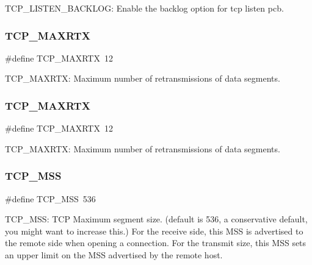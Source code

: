 T\+C\+P\+\_\+\+L\+I\+S\+T\+E\+N\+\_\+\+B\+A\+C\+K\+L\+OG\+: Enable the backlog option for tcp listen pcb. \mbox{\label{group__lwip__opts__tcp_ga0dee0911197855bdf19ef79778c241a6}} 
\subsubsection{\texorpdfstring{T\+C\+P\+\_\+\+M\+A\+X\+R\+TX}{TCP\_MAXRTX}\hspace{0.1cm}{\footnotesize\ttfamily [1/2]}}
{\footnotesize\ttfamily \#define T\+C\+P\+\_\+\+M\+A\+X\+R\+TX~12}

T\+C\+P\+\_\+\+M\+A\+X\+R\+TX\+: Maximum number of retransmissions of data segments. \mbox{\label{group__lwip__opts__tcp_ga0dee0911197855bdf19ef79778c241a6}} 
\subsubsection{\texorpdfstring{T\+C\+P\+\_\+\+M\+A\+X\+R\+TX}{TCP\_MAXRTX}\hspace{0.1cm}{\footnotesize\ttfamily [2/2]}}
{\footnotesize\ttfamily \#define T\+C\+P\+\_\+\+M\+A\+X\+R\+TX~12}

T\+C\+P\+\_\+\+M\+A\+X\+R\+TX\+: Maximum number of retransmissions of data segments. \mbox{\label{group__lwip__opts__tcp_gaf1ab7bb27860aa3677c387a2f3ba317b}} 
\subsubsection{\texorpdfstring{T\+C\+P\+\_\+\+M\+SS}{TCP\_MSS}\hspace{0.1cm}{\footnotesize\ttfamily [1/2]}}
{\footnotesize\ttfamily \#define T\+C\+P\+\_\+\+M\+SS~536}

T\+C\+P\+\_\+\+M\+SS\+: T\+CP Maximum segment size. (default is 536, a conservative default, you might want to increase this.) For the receive side, this M\+SS is advertised to the remote side when opening a connection. For the transmit size, this M\+SS sets an upper limit on the M\+SS advertised by the remote host. \mbox{\label{group__lwip__opts__tcp_gaf1ab7bb27860aa3677c387a2f3ba317b}} 
